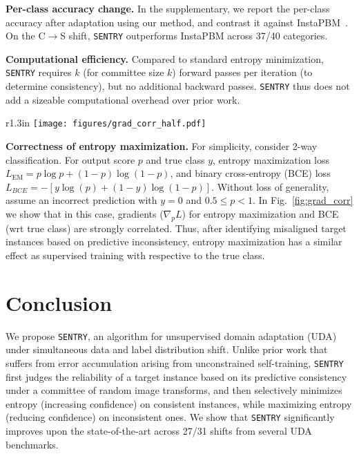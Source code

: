 \documentclass[10pt,twocolumn,letterpaper]{article}
\newcommand{\method}{\texttt{SENTRY}\xspace}
\begin{document}
\par\noindent \textbf{Per-class accuracy change.} In the supplementary, we report the per-class accuracy after adaptation using our method, and contrast it against InstaPBM~\cite{li2020rethinking}. On the C$\to$S shift, \method outperforms InstaPBM across 37/40 categories. 


\par\noindent \textbf{Computational efficiency.} Compared to standard entropy minimization, \method requires $k$ (for committee size $k$) forward passes per iteration (to determine consistency), but no additional backward passes. \method thus does not add a sizeable computational overhead over prior work.

\begin{wrapfigure}{r}{1.3in}
    \vspace{-\intextsep}
    \texttt{[image: figures/grad\_corr\_half.pdf]}
    \caption{$\nabla_{p} L$ v/s p}\vspace{-10pt}
    \label{fig:grad_corr}
  \end{wrapfigure}
\par\noindent \textbf{Correctness of entropy maximization.} 
For simplicity, consider 2-way classification. For output score $p$ and true class $y$, entropy maximization loss $L_{\text{EM}}=p\log p + (1-p)\log(1-p)$, and binary cross-entropy (BCE) loss $L_{BCE} = -\left[ y\log(p) + (1-y)\log(1-p)\right]$. Without loss of generality, assume an incorrect prediction with $y=0$ and $0.5 \le p < 1$. In Fig.~\ref{fig:grad_corr} we show that in this case, gradients ($\nabla_{p} L$) for entropy maximization and BCE (wrt true class) are strongly correlated. Thus, after identifying misaligned target instances based on predictive inconsistency, entropy maximization has a similar effect as supervised training with respective to the true class.

 \vspace{-7pt}
\section{Conclusion}
\vspace{-5pt}

\noindent We propose \method, an algorithm for unsupervised domain adaptation (UDA) under simultaneous data and label distribution shift. Unlike prior work that suffers from error accumulation arising from unconstrained self-training, \method first judges the reliability of a target instance based on its predictive consistency under a committee of random image transforms, and then selectively minimizes entropy (increasing confidence) on consistent instances, while maximizing entropy (reducing confidence) on inconsistent ones. We show that \method significantly improves upon the state-of-the-art across 27/31 shifts from several UDA benchmarks.
\end{document}
